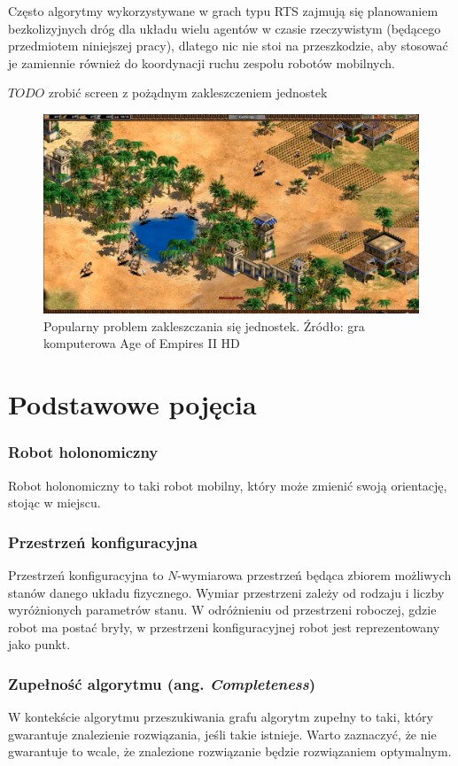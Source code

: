 Często algorytmy wykorzystywane w grach typu RTS zajmują się planowaniem bezkolizyjnych dróg dla układu wielu agentów w czasie rzeczywistym (będącego przedmiotem niniejszej pracy), dlatego nic nie stoi na przeszkodzie, aby stosować je zamiennie również do koordynacji ruchu zespołu robotów mobilnych.

$TODO$ zrobić screen z pożądnym zakleszczeniem jednostek
\begin{figure}[H]
	\centering
	\includegraphics[width=14cm]{img/games/age-deadlock}
	\caption{Popularny problem zakleszczania się jednostek. Źródło: gra komputerowa Age of Empires II HD}
	\label{fig:img_games_age-deadlock}
\end{figure}

\section{Podstawowe pojęcia}
\subsubsection{Robot holonomiczny}
Robot holonomiczny to taki robot mobilny, który może zmienić swoją orientację, stojąc w miejscu.

\subsubsection{Przestrzeń konfiguracyjna}
Przestrzeń konfiguracyjna to $N$-wymiarowa przestrzeń będąca zbiorem możliwych stanów danego układu fizycznego.
Wymiar przestrzeni zależy od rodzaju i liczby wyróżnionych parametrów stanu.
W odróżnieniu od przestrzeni roboczej, gdzie robot ma postać bryły, w przestrzeni konfiguracyjnej robot jest reprezentowany jako punkt.

\subsubsection{Zupełność algorytmu (ang. {\it Completeness})}
W kontekście algorytmu przeszukiwania grafu algorytm zupełny to taki, który gwarantuje znalezienie rozwiązania, jeśli takie istnieje.
Warto zaznaczyć, że nie gwarantuje to wcale, że znalezione rozwiązanie będzie rozwiązaniem optymalnym.


